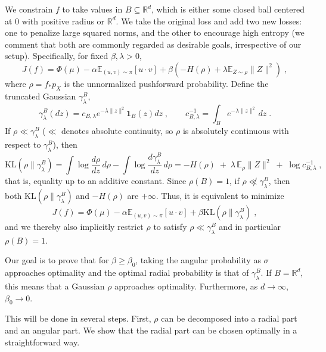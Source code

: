 \documentclass{article}
\newcommand{\E}{\mathbb{E}}
\newcommand{\KL}{\mathrm{KL}}
\newcommand{\R}{\mathbb{R}}
\newcommand{\ignore}[1]{}
\begin{document}
We constrain $f$ to take values in $B\subseteq\R^d$, which is either some closed ball centered at $0$ with positive radius or $\R^d$. 
We take the original loss and add two new losses: one to penalize large squared norms, and the other to encourage high entropy (we comment that both are commonly regarded as desirable goals, irrespective of our setup). Specifically, for fixed $\beta,\lambda>0$,
\begin{equation}
\label{eq:angkl}
J(f)
=\Phi(\mu)-\alpha\E_{(u,v)\sim\pi}[u\cdot v]
+\beta(-H(\rho)+\lambda\E_{Z\sim\rho}\|Z\|^2)\;,
\end{equation}
where $\rho = f_*p_X$ is the unnormalized pushforward probability. Define the truncated Gaussian $\gamma_\lambda^B$,
\begin{equation}
\gamma_\lambda^{B}(dz)=c_{B,\lambda}e^{-\lambda\|z\|^2}\mathbf 1_{B}(z)dz\;,\qquad
c_{B,\lambda}^{-1}=\int_{B}e^{-\lambda\|z\|^2}\,dz\;.
\end{equation}
If $\rho\ll \gamma_\lambda^{B}$ ($\ll$ denotes absolute continuity, so $\rho$ is absolutely continuous with respect to $\gamma_\lambda^{B}$), then
\begin{equation}
\KL(\rho\|\gamma_\lambda^{B})
=\int \log\frac{d\rho}{dz}\,d\rho-\int\log\frac{d\gamma_\lambda^{B}}{dz}\,d\rho
=-H(\rho)\;+\;\lambda\,\E_\rho\|Z\|^2\;+\;\log c_{B,\lambda}^{-1}\;,
\end{equation}
that is, equality up to an additive constant. Since $\rho(B)=1$, if $\rho\not\ll \gamma_\lambda^{B}$, then both $\KL(\rho\|\gamma_\lambda^{B})$ and $-H(\rho)$ are $+\infty$. 
Thus, it is equivalent to minimize 
\begin{equation}\label{eq:with kl1}
J(f)
=\Phi(\mu)-\alpha\E_{(u,v)\sim\pi}[u\cdot v]
+\beta \KL(\rho\|\gamma_\lambda^{B})\;,
\end{equation}
and we thereby also implicitly restrict $\rho$ to satisfy $\rho\ll \gamma_\lambda^{B}$ and in particular $\rho(B)=1$.

\ignore{

}

Our goal is to prove that for $\beta\geq \beta_0$, taking the angular probability as $\sigma$ approaches optimality and the optimal radial probability is that of $\gamma_\lambda^B$. If $B=\R^d$, this means that a Gaussian $\rho$ approaches optimality. Furthermore, as $d\to\infty$, $\beta_0\to 0$.

This will be done in several steps.
First, $\rho$ can be decomposed into a radial part and an angular part. We show that the radial part can be chosen optimally in a straightforward way. 
\end{document}
